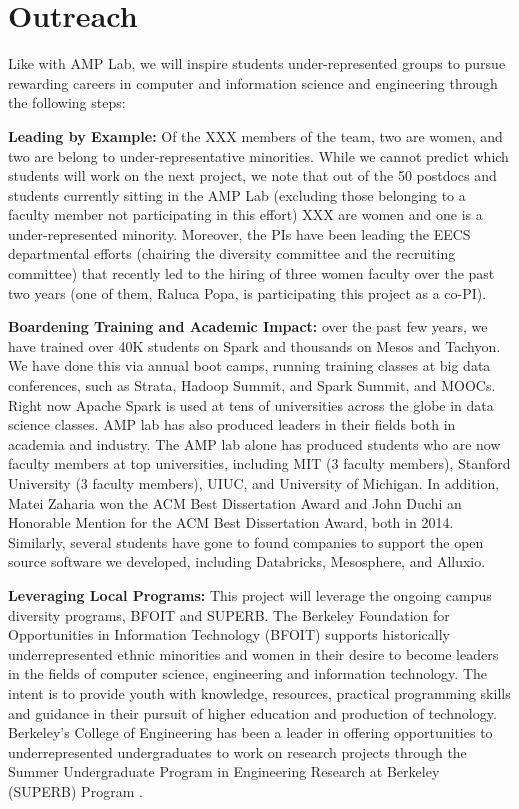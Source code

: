 \section{Outreach}

Like with AMP Lab, we will inspire students under-represented groups to pursue rewarding careers in computer and information science and engineering through the following steps:

{\bf Leading by Example:} Of the XXX members of the  team, two are women, and two are belong to under-representative minorities.  While we cannot predict which students will work on the next project, we note that out of the 50 postdocs and students currently sitting in the AMP Lab (excluding those belonging to a faculty member not participating in this effort) XXX are women and one is a under-represented minority.  Moreover, the PIs have been leading the EECS departmental efforts (chairing the diversity committee and the recruiting committee) that recently led to the hiring of three women faculty over the past two years (one of them, Raluca Popa, is participating this project as a co-PI).

{\bf Boardening Training and Academic Impact:} over the past few years, we have trained over 40K students on Spark and thousands on Mesos and Tachyon. We have done this via annual boot camps, running training classes at big data conferences, such as Strata, Hadoop Summit, and Spark Summit, and MOOCs.  Right now Apache Spark is used at tens of universities across the globe in data science classes. AMP lab has also produced leaders in their fields both in academia and  industry. The AMP lab alone has produced students who are now faculty members at top universities, including MIT (3 faculty members), Stanford University (3 faculty members), UIUC, and University of Michigan. In addition, Matei Zaharia won the ACM Best Dissertation Award and John Duchi an Honorable Mention for the ACM Best Dissertation Award, both in 2014. Similarly, several students have gone to found companies to support the open source software we developed, including Databricks, Mesosphere, and Alluxio. 

{\bf Leveraging  Local Programs:} This project will leverage the ongoing campus diversity programs, BFOIT and SUPERB. The Berkeley Foundation for Opportunities in Information Technology (BFOIT) \cite{bfoit} supports historically underrepresented ethnic minorities and women in their desire to become leaders in the fields of computer science, engineering and information technology. The intent is to provide youth with knowledge, resources, practical programming skills and guidance in their pursuit of higher education and production of technology.  Berkeley's College of Engineering has been a leader in offering opportunities to underrepresented undergraduates to work on research projects through the Summer Undergraduate Program in Engineering Research at Berkeley (SUPERB) Program \cite{superb}.  


